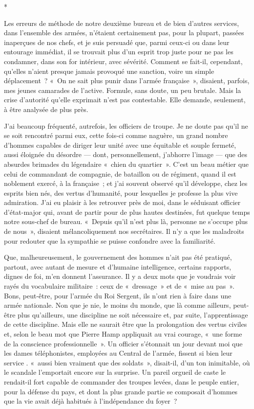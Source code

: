 \documentclass[french,twoside]{book} %
\begin{document}
\begin{center}
*\end{center}
\noindent Les erreurs de méthode de notre deuxième bureau et de bien d’autres services, dans l’ensemble des armées, n’étaient certainement pas, pour la plupart, passées inaperçues de nos chefs, et je suis persuadé que, parmi ceux-ci ou dans leur entourage immédiat, il se trouvait plus d’un esprit trop juste pour ne pas les condamner, dans son for intérieur, avec sévérité. Comment se fait-il, cependant, qu’elles n’aient presque jamais provoqué une sanction, voire un simple déplacement ? « On ne sait plus punir dans l’armée française », disaient, parfois, mes jeunes camarades de l’active. Formule, sans doute, un peu brutale. Mais la crise d’autorité qu’elle exprimait n’est pas contestable. Elle demande, seulement, à être analysée de plus près.\par
J’ai beaucoup fréquenté, autrefois, les officiers de troupe. Je ne doute pas qu’il ne se soit rencontré parmi eux, cette fois-ci comme naguère, un grand nombre d’hommes capables de diriger leur unité avec une équitable et souple fermeté, aussi éloignée du désordre — dont, personnellement, j’abhorre l’image — que des absurdes brimades du légendaire « chien du quartier ». C’est un beau métier que celui de   commandant de compagnie, de bataillon ou de régiment, quand il est noblement exercé, à la française ; et j’ai souvent observé qu’il développe, chez les esprits bien nés, des vertus d’humanité, pour lesquelles je professe la plus vive admiration. J’ai eu plaisir à les retrouver près de moi, dans le séduisant officier d’état-major qui, avant de partir pour de plus hautes destinées, fut quelque temps notre sous-chef de bureau. « Depuis qu’il n’est plus là, personne ne s’occupe plus de nous », disaient mélancoliquement nos secrétaires. Il n’y a que les maladroits pour redouter que la sympathie se puisse confondre avec la familiarité.\par
Que, malheureusement, le gouvernement des hommes n’ait pas été pratiqué, partout, avec autant de mesure et d’humaine intelligence, certains rapports, dignes de foi, m’en donnent l’assurance. Il y a deux mots que je voudrais voir rayés du vocabulaire militaire : ceux de « dressage » et de « mise au pas ». Bons, peut-être, pour l’armée du Roi Sergent, ils n’ont rien à faire dans une armée nationale. Non que je nie, le moins du monde, que là comme ailleurs, peut-être plus qu’ailleurs, une discipline ne soit nécessaire et, par suite, l’apprentissage de cette discipline. Mais elle ne saurait être que la prolongation des vertus civiles et, selon le beau mot que Pierre Hamp appliquait au vrai courage, « une forme de la conscience professionnelle ». Un officier s’étonnait un jour devant moi que les dames téléphonistes, employées au Central de l’armée, fissent si bien leur service . « aussi bien vraiment que des soldats », disait-il, d’un ton inimitable, où le scandale l’emportait encore sur la surprise. Un pareil orgueil de caste le rendait-il fort capable de commander des troupes levées, dans le peuple entier, pour la défense du pays, et dont la plus grande partie se composait d’hommes que la vie avait déjà habitués à l’indépendance du foyer ?\par
\end{document}
